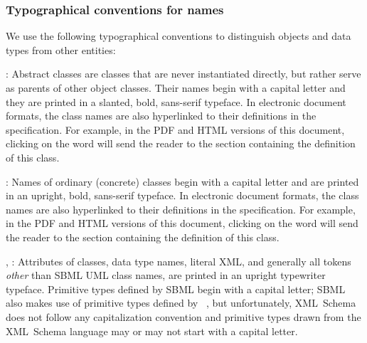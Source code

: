 


\subsubsection{Typographical conventions for names}
\label{sec:notation-typographical}

We use the following typographical conventions to distinguish
objects and data types from other entities:

\begin{description}
  
\item {}: Abstract classes are classes
  that are never instantiated directly, but rather serve as
  parents of other object classes.  Their names begin with a
  capital letter and they are printed in a slanted, bold,
  sans-serif typeface.  In electronic document formats, the class
  names are also hyperlinked to their definitions in the
  specification.  For example, in the PDF and HTML versions of
  this document, clicking on the word \SBase will send the reader
  to the section containing the definition of this class.
  
\item {}: Names of ordinary (concrete) classes begin
  with a capital letter and are printed in an upright,
  bold, sans-serif typeface.  In electronic document
  formats, the class names are also hyperlinked to their
  definitions in the specification.  For example, in the PDF and
  HTML versions of this document, clicking on the word \Species
  will send the reader to the section containing the definition of
  this class.

\item {}, : Attributes of
  classes, data type names, literal XML, and generally all tokens
  \emph{other} than SBML UML class names, are printed in an
  upright typewriter typeface.  Primitive types defined by SBML
  begin with a capital letter; SBML also makes use of primitive
  types defined by
  \xmlschemaone~\citep{biron:2000,fallside:2000,thompson:2000},
  but unfortunately, XML~Schema does not follow any capitalization
  convention and primitive types drawn from the XML~Schema
  language may or may not start with a capital letter.

\end{description}


